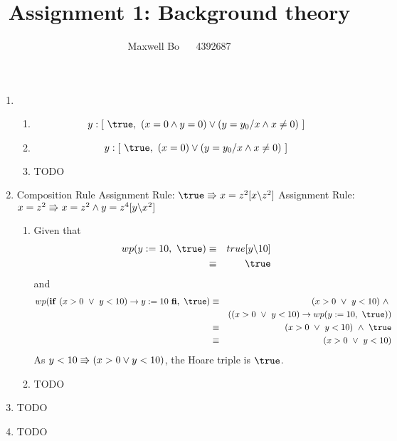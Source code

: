 \documentclass{article}
\title{\bf Assignment 1: Background theory}
\author{Maxwell Bo  ~~ 4392687}
\begin{document}
\maketitle

\begin{enumerate}
    \item 
        \begin{enumerate}
            \item \[ y: [\ \true,\ (x = 0 \land y = 0) \lor (y = y_0 / x \land x \neq 0)\ ]\]
            \item \[ y: [\ \true,\ (x = 0) \lor (y = y_0 / x \land x \neq 0)\ ]\]
            \item TODO
        \end{enumerate}
    \item 
        \DERIVE
         {Composition Rule}
         {Assignment Rule: $\true \entails x = z^2 [x \backslash z^2]$}
         {Assignment Rule: $x = z^2 \Rrightarrow x = z^2 \land y = z ^ 4[y \backslash x^2]$}
        \ENDDERIVE
    \begin{enumerate}
        \item Given that
            \begin{eqnarray*}
                wp(y := 10,\ \true) & \equiv & true[y \backslash 10]\\
                                   & \equiv & \true
            \end{eqnarray*} 
                and 
            \begin{eqnarray*}
                wp(\If~ (x > 0 ~\lor~ y < 10) \rightarrow y:= 10 ~\Fi,\ \true) & \equiv & (x > 0 ~\lor~ y < 10) ~\land~ \\
                    & & ((x > 0 ~\lor~ y < 10) \rightarrow wp(y := 10,\ \true))\\
                & \equiv & (x > 0 ~\lor~ y < 10) ~\land~ \true\\
                & \equiv & (x > 0 ~\lor~ y < 10)
            \end{eqnarray*}
            As $y < 10 \Rrightarrow (x > 0 \lor y < 10)$, the Hoare triple is $\true$.
        \item TODO
    \end{enumerate}
    \item TODO
    \item TODO
\end{enumerate}
\end{document}
